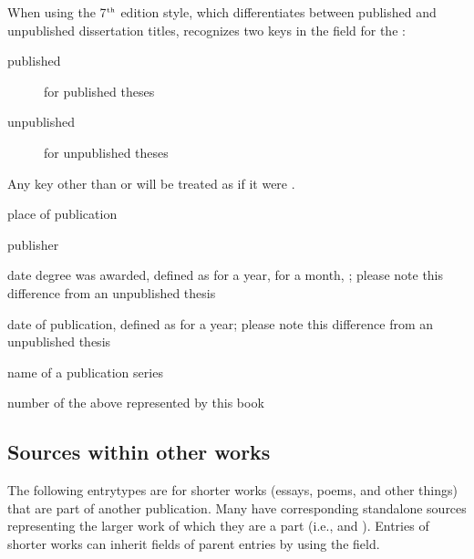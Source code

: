 \documentclass{ltxdockit}
\newcommand*{\biblatexmla}{\sty{biblatex-mla}\xspace}
\newcommand{\superscript}[1]{\ensuremath{^{\textrm{\tiny{#1}}}}}
\newenvironment*{optionslistNOT}
  {\list{}{%
     \setlength{\labelwidth}{\marglistwidth}%
     \setlength{\labelsep}{\marglistsep}%
     \setlength{\leftmargin}{50pt}%
     \renewcommand*{\makelabel}[1]{\hss\marglistfont##1}}%
   \def\optionitem##1{%
     \item[{\textbf{##1}}]}}
  {\endlist}
\begin{document}
\begin{optionslistNOT}
	
	\optionitem{entrysubtype}
	
	When using the 7\superscript{th} edition style, which differentiates between published and unpublished dissertation titles, \biblatexmla recognizes two keys in the  field for the :
	
	\begin{description}
		\item[published] for published theses
		\item[unpublished] for unpublished theses
	\end{description}
	
	Any key other than  or  will be treated as if it were .
	
	\optionitem{location}
	
	place of publication
	
	\optionitem{publisher}
	
	publisher
	
	\optionitem{origdate}
	
	date degree was awarded, defined as  for a year,  for a month, ; please note this difference from an unpublished thesis
	
	\optionitem{date}
	
	date of publication, defined as  for a year; please note this difference from an unpublished thesis
	
	\optionitem{series}
	
	name of a publication series
	
	\optionitem{number}
	
	number of the above  represented by this book
	
\end{optionslistNOT}


\subsection{Sources within other works}
The following entrytypes are for shorter works (essays, poems, and other things) that are part of another publication. Many have corresponding standalone sources representing the larger work of which they are a part (i.e.,  and ). Entries of shorter works can inherit fields of parent entries by using the  field.
\end{document}
